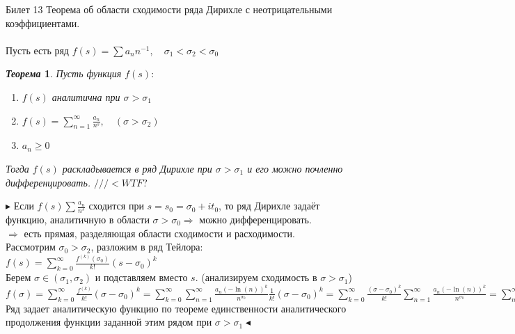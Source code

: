 \documentclass[a4paper,12pt]{article}
\newtheorem{teo}{\textit{Теорема}}
\newcommand{\q}{\quad}
\newcommand{\pb}{\blacktriangleright}
\newcommand{\pe}{\blacktriangleleft}
\newcommand{\Ra}{\Rightarrow}
\newcommand{\SL}{\sum\limits}
\newcommand{\os}{\left(}
\newcommand{\cs}{\right)}
\begin{document}
\newpage
\begin{mybox}{\hypertarget{bil13}{Билет 13}}
Теорема об области сходимости ряда Дирихле с неотрицательными коэффициентами.\\\q\\
Пусть есть  ряд $f(s) = \sum a_n n^{-1}, \q \sigma_1 < \sigma_2 < \sigma_0$\\
\begin{teo} Пусть функция $f(s):$
\begin{enumerate}
\item $f(s)$ аналитична при $\sigma > \sigma_1$
\item $f(s) = \SL_{n=1}^\infty  \frac{a_n}{n^s},\q(\sigma > \sigma_2) $
\item $a_n \ge 0$
\end{enumerate}
Тогда $f(s)$ раскладывается в ряд Дирихле при $\sigma > \sigma_1$ и его можно почленно дифференцировать. $///<WTF?$
\end{teo}
$\pb $ Если $f(s) \sum \frac{a_n}{n^s}$ сходится при $s = s_0 = \sigma_0 + it_0$, то ряд Дирихле задаёт функцию, аналитичную в области $\sigma > \sigma_0\Ra$ можно дифференцировать.\\
$\Ra$ есть прямая, разделяющая области сходимости и расходимости.\\
Рассмотрим $\sigma_0 > \sigma_2$,  разложим в ряд Тейлора:\\
$f(s) = \SL_{k=0}^\infty \frac{f^{(k)}(\sigma_0)}{k!} (s - \sigma_0)^k $\\
Берем $\sigma\in(\sigma_1, \sigma_2)$ и подставляем вместо $s$. (анализируем сходимость в $\sigma > \sigma_1$)\\
$f(\sigma) = \SL_{k=0}^\infty \frac{f^{(k)}}{k!}(\sigma - \sigma_0)^k = \SL_{k=0}^\infty \SL_{n=1}^\infty \frac{a_n (-\ln(n))^k}{n^{\sigma_0}} \frac{1}{k!} (\sigma - \sigma_0)^k   = \SL_{k=0}^\infty \frac{(\sigma - \sigma_0)^k}{k!}\SL_{n=1}^\infty \frac{a_n (-\ln(n))^k}{n^{\sigma_0}} = \SL_{n=1}^\infty \frac{a_n}{n^{\sigma_0}} \SL_{k=0}^\infty \frac{\os(\sigma_0 - \sigma)\ln(n)\cs^k}{k!}  = \SL_{n=1}^\infty \frac{a_n}{n^{\sigma_0}} e^{(\sigma - \sigma_0)\ln(n)} = \SL_{n=1}^\infty \frac{a_n}{n^\sigma} $\\
Ряд задает аналитическую функцию по теореме единственности аналитического продолжения функции заданной этим рядом при $\sigma > \sigma_1 \pe$
\end{mybox}
\end{document}
